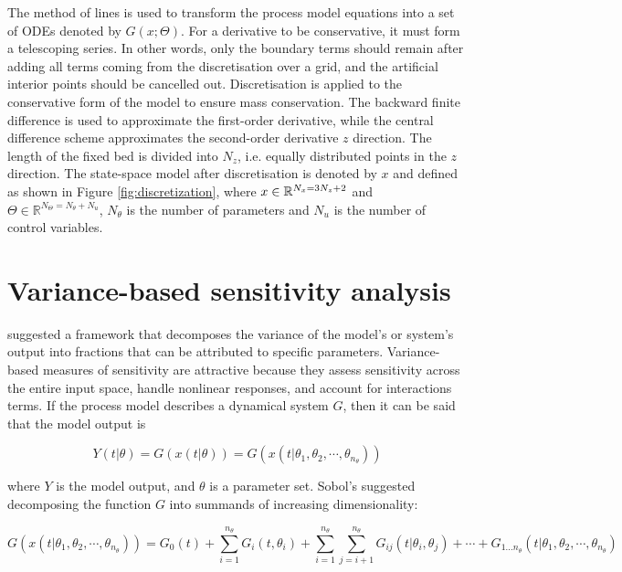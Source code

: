 \documentclass[a4paper,fleqn]{cas-dc}
\begin{document}
		The method of lines is used to transform the process model equations into a set of ODEs denoted by $G(x;\Theta)$. For a derivative to be conservative, it must form a telescoping series. In other words, only the boundary terms should remain after adding all terms coming from the discretisation over a grid, and the artificial interior points should be cancelled out. Discretisation is applied to the conservative form of the model to ensure mass conservation. The backward finite difference is used to approximate the first-order derivative, while the central difference scheme approximates the second-order derivative $z$ direction. The length of the fixed bed is divided into $N_z$, i.e. equally distributed points in the $z$ direction. The state-space model after discretisation is denoted by $x$ and defined as shown in Figure \ref{fig:discretization}, where ${\color{black}x} \in \mathbb{R}^{N_x = 3N_z+2} $ and $\Theta \in \mathbb{R}^{N_\Theta =  N_{\theta} + N_u } $, $N_{\theta}$ is the number of parameters and $N_{u}$ is the number of control variables.
				
		\section{Variance-based sensitivity analysis} \label{chap:Sobol_Analysis}
		
		\citet{Sobol2001} suggested a framework that decomposes the variance of the model's or system's output into fractions that can be attributed to specific parameters. Variance-based measures of sensitivity are attractive because they assess sensitivity across the entire input space, handle nonlinear responses, and account for interactions terms. If the process model describes a dynamical system $G$, then it can be said that the model output is 
		
		{\footnotesize
			\begin{equation}
				Y\left(t|\theta\right) = G\left(x\left(t|\theta\right)\right) = G\left(x\left(t|\theta_1, \theta_2, \cdots, \theta_{n_\theta} \right)\right) 
		\end{equation} }
		
		where $Y$ is the model output, and $\theta$ is a parameter set. Sobol's suggested decomposing the function $G$ into summands of increasing dimensionality:
		
		{\footnotesize
			\begin{equation} \label{EQ:Sobol_decomposition_1}
				G\left(x\left(t|\theta_1, \theta_2, \cdots, \theta_{n_\theta} \right)\right) = G_0\left(t\right) + \sum_{i=1}^{n_\theta} G_i(t, \theta_i) + \sum_{i=1}^{n_\theta} \sum_{j=i+1}^{n_\theta} G_{ij} \left(t| \theta_i, \theta_j \right) + \cdots + G_{1...n_\theta}\left(t|\theta_1, \theta_2, \cdots, \theta_{n_\theta} \right)
		\end{equation} }
		
\end{document}

